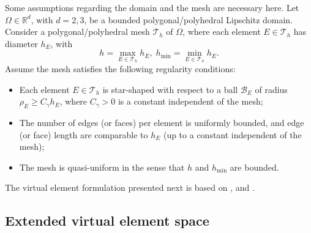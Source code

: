 \documentclass{article}
\begin{document}
Some assumptions regarding the domain and the mesh are necessary here. Let $\Omega \in \mathbb{R}^d$, with $d=2,3$, be a bounded polygonal/polyhedral Lipschitz domain. Consider a polygonal/polyhedral mesh $\mathcal{T}_h$ of $\Omega$, where each element $E \in \mathcal{T}_h$ has diameter $h_E$, with
\begin{equation}
    \nonumber
    h = \max \limits_{E \in \mathcal{T}_h} h_E, \; h_{\min} = \min \limits_{E \in \mathcal{T}_h} h_E. 
\end{equation}
Assume the mesh satisfies the following regularity conditions:
\begin{itemize}
    \item Each element $E \in \mathcal{T}_h$ is star-shaped with respect to a ball $\mathcal{B}_E$ of radius $\rho_E \geq C_\gamma h_E$, where $C_\gamma > 0$ is a constant independent of the mesh;
    \item The number of edges (or faces) per element is uniformly bounded, and edge (or face) length are comparable to $h_E$ (up to a constant independent of the mesh);
    \item The mesh is quasi-uniform in the sense that $h$ and $h_{\min}$ are bounded.
\end{itemize}

The virtual element formulation presented next is based on \cite{beirao2013vem}, \cite{veiga2014hitchhiker} and \cite{vacca2015parabolic}.


\subsection{Extended virtual element space}
\label{sec:extended_ve_space}
\end{document}
